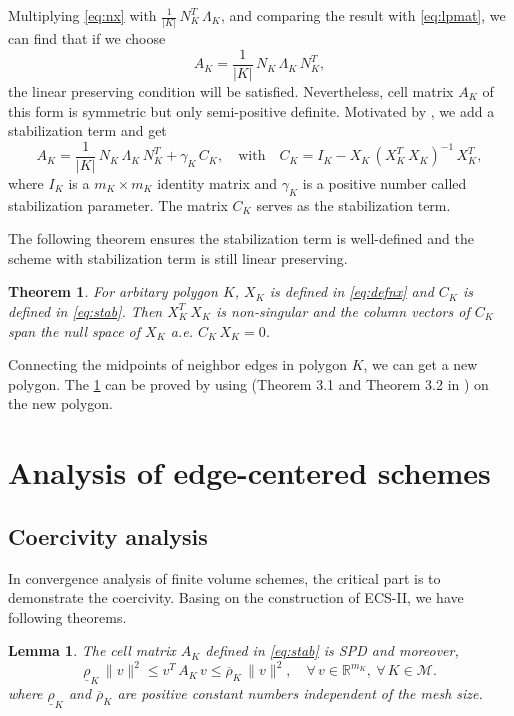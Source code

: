 \documentclass[times,review,preprint]{elsarticle}
\newtheorem{theorem}{Theorem}
\newtheorem{lemma}{Lemma}
\newcommand{\Rnum}{\mathbb{R}}
\begin{document}
Multiplying \cref{eq:nx} with $\frac{1}{|K|} \, N_K^T \, \Lambda_K$, and comparing the result with \cref{eq:lpmat}, we can find that if we choose
\begin{equation*}
A_K = \frac{1}{|K|} \, N_K \, \Lambda_K \, N_K^T,
\end{equation*}
the linear preserving condition will be satisfied. Nevertheless, cell matrix $A_K$ of this form is symmetric but only semi-positive definite. Motivated by \cite{Wu-Gao-Dai}, we add a stabilization term and get
\begin{equation}\label{eq:stab}
A_K = \frac{1}{|K|} \, N_K \, \Lambda_K \, N_K^T + \gamma_K \, C_K, \quad \text{with} \quad C_K = I_K - X_K \, (X_K^T \, X_K)^{-1} \, X_K^T,
\end{equation}
where $I_K$ is a $m_K \times m_K$ identity matrix and $\gamma_K$ is a positive number called stabilization parameter. The matrix $C_K$ serves as the stabilization term.

The following theorem ensures the stabilization term is well-defined and the scheme with stabilization term is still linear preserving.

\begin{theorem}\label{thm:X}
For arbitary polygon $K$, $X_K$ is defined in \cref{eq:defnx} and $C_K$ is defined in \cref{eq:stab}. Then $X_K^T \, X_K$ is non-singular and the column vectors of $C_K$ span the null space of $X_K$ a.e. $C_K \, X_K = 0$.
\end{theorem}

Connecting the midpoints of neighbor edges in polygon $K$, we can get a new polygon. The \cref{thm:X} can be proved by using (Theorem 3.1 and Theorem 3.2 in \cite{dong_analysis_2020}) on the new polygon.

\section{Analysis of edge-centered schemes}\label{sec4}

\subsection{Coercivity analysis}

In convergence analysis of finite volume schemes, the critical part is to demonstrate the coercivity. Basing on the construction of ECS-II, we have following theorems.

\begin{lemma}\label{lemma:SPD}
The cell matrix $A_K$ defined in \cref{eq:stab} is SPD and moreover,
\begin{equation}
\underline{\rho}_{K} \, \|v\|^2 \leq v^T \, A_{K} \, v \leq \overline{\rho}_{K} \, \|v\|^2, \quad \forall \, v \in \Rnum^{m_K}, \ \forall \, K \in \mathcal{M}.
\end{equation}
where $\underline{\rho}_{K}$ and $\overline{\rho}_{K}$ are positive constant numbers independent of the mesh size.
\end{lemma}
\end{document}
